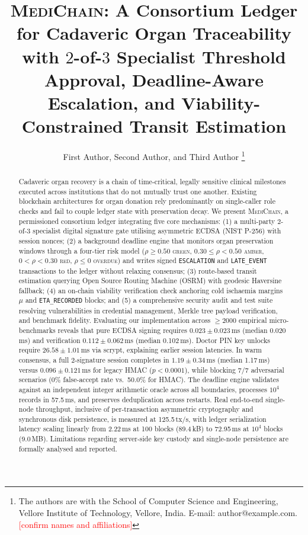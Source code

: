 \documentclass[journal]{IEEEtran}
\newcommand{\todo}[1]{\textcolor{red}{[#1]}}
\newcommand{\mc}{\textsc{MediChain}}
\begin{document}
\title{\mc: A Consortium Ledger for Cadaveric Organ Traceability with $2$-of-$3$ Specialist Threshold Approval, Deadline-Aware Escalation, and Viability-Constrained Transit Estimation}

\author{First Author,
        Second Author,
        and Third Author%
\thanks{The authors are with the School of Computer Science and Engineering,
Vellore Institute of Technology, Vellore, India. E-mail: author@example.com. \todo{confirm names and affiliations}}}

\maketitle

\begin{abstract}
Cadaveric organ recovery is a chain of time-critical, legally sensitive
clinical milestones executed across institutions that do not mutually trust one
another. Existing blockchain architectures for organ donation rely predominantly on
single-caller role checks and fail to couple ledger state with preservation
decay. We present \mc, a permissioned consortium ledger integrating five core
mechanisms: (1) a multi-party $2$-of-$3$ specialist digital signature gate
utilising asymmetric ECDSA (NIST P-256) with session nonces; (2) a background
deadline engine that monitors organ preservation windows through a four-tier risk
model ($\rho\ge0.50$ \textsc{green}, $0.30\le\rho<0.50$ \textsc{amber},
$0<\rho<0.30$ \textsc{red}, $\rho\le0$ \textsc{overdue}) and writes signed
\texttt{ESCALATION} and \texttt{LATE\_EVENT} transactions to the ledger without
relaxing consensus; (3) route-based transit estimation querying Open Source
Routing Machine (OSRM) with geodesic Haversine fallback; (4) an on-chain
viability verification check anchoring cold ischaemia margins $\mu$ and
\texttt{ETA\_RECORDED} blocks; and (5) a comprehensive security audit and test
suite resolving vulnerabilities in credential management, Merkle tree payload
verification, and benchmark fidelity. Evaluating our implementation across $\ge2000$
empirical micro-benchmarks reveals that pure ECDSA signing requires $0.023\pm0.023$\,ms
(median 0.020\,ms) and verification $0.112\pm0.062$\,ms (median 0.102\,ms). Doctor
PIN key unlocks require $26.58\pm1.01$\,ms via scrypt, explaining earlier session
latencies. In warm consensus, a full $2$-signature session completes in $1.19\pm0.34$\,ms
(median 1.17\,ms) versus $0.096\pm0.121$\,ms for legacy HMAC ($p<0.0001$), while
blocking 7/7 adversarial scenarios (0\% false-accept rate vs.\ 50.0\% for HMAC).
The deadline engine validates against an independent integer arithmetic oracle
across all boundaries, processes $10^4$ records in 57.5\,ms, and preserves
deduplication across restarts. Real end-to-end single-node throughput, inclusive
of per-transaction asymmetric cryptography and synchronous disk persistence, is
measured at 125.5\,tx/s, with ledger serialization latency scaling linearly from
2.22\,ms at 100 blocks (89.4\,kB) to 72.95\,ms at $10^4$ blocks (9.0\,MB).
Limitations regarding server-side key custody and single-node persistence are
formally analysed and reported.
\end{abstract}
\end{document}
